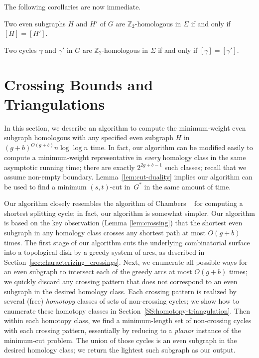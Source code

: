 \documentclass[letterpaper,review]{siamart190516}
\def\Z{\mathbb{Z}}
\def\cycle{\gamma}
\begin{document}
The following corollaries are now immediate.

\begin{corollary}
Two even subgraphs $H$ and $H'$ of $G$ are $\Z_2$-homologous in $\Sigma$ if and only if $[H] = [H']$.
\end{corollary}

\begin{corollary}
Two cycles $\cycle$ and $\cycle'$ in $G$ are $\Z_2$-homologous in $\Sigma$ if and only if $[\cycle] = [\cycle']$.
\end{corollary}

\section{Crossing Bounds and Triangulations}
\label{sec:crossing}

In this section, we describe an
algorithm to compute the minimum-weight even subgraph homologous with any specified even subgraph 
$H$ in $(g+b)^{O(g+b)}n\log \log n$ time.  In fact, our algorithm can be
modified easily to compute a minimum-weight representative in
\emph{every} homology class in the same asymptotic running time;
there are exactly $2^{2g+b-1}$ such classes; recall that we assume non-empty boundary.
Lemma~\ref{lem:cut-duality} implies our algorithm can be used to find a minimum $(s,t)$-cut in~$G^*$ in the same amount of time.

Our algorithm closely resembles the algorithm of Chambers \etal~\cite{ccelw-scsih-08} for computing a shortest splitting cycle; in fact, our algorithm is somewhat simpler.  Our algorithm is based on the key observation (Lemma \ref{lem:crossing})  that the shortest even subgraph in any homology class crosses any shortest path at most $O(g+b)$ times.  The first stage of our algorithm cuts the underlying combinatorial surface into a topological disk by a greedy system of arcs, as described in Section~\ref{sec:characterizing_crossings}.  Next, we enumerate all possible ways for an even subgraph to intersect each of the greedy arcs at most $O(g+b)$ times; we quickly discard any crossing pattern that does not correspond to an even subgraph in the desired homology class.  Each crossing pattern is realized by several (free) \emph{homotopy} classes of sets of non-crossing cycles; we show how to enumerate these homotopy classes in Section~\ref{SS:homotopy-triangulation}.  Then within each homotopy class, we find a minimum-length set of non-crossing cycles with each crossing pattern, essentially by reducing to a \emph{planar} instance of the minimum-cut problem.  The union of those cycles is an even subgraph in the desired homology class; we return the lightest such subgraph as our output.
\end{document}
